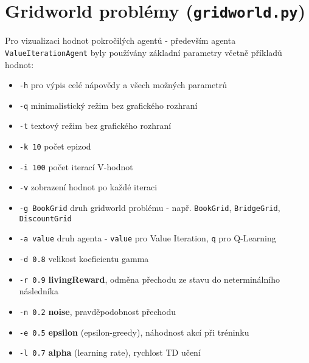 \section{Gridworld problémy (\texttt{gridworld.py})}
\label{priloha:manualg}
Pro vizualizaci hodnot pokročilých agentů - především agenta \texttt{ValueIterationAgent} byly používány základní parametry včetně příkladů hodnot:
\begin{itemize}
\item \texttt{-h} pro výpis celé nápovědy a všech možných parametrů
\item \texttt{-q} minimalistický režim bez grafického rozhraní
\item \texttt{-t} textový režim bez grafického rozhraní
\item \texttt{-k 10} počet epizod
\item \texttt{-i 100} počet iterací V-hodnot
\item \texttt{-v} zobrazení hodnot po každé iteraci
\item \texttt{-g BookGrid} druh gridworld problému - např. \texttt{BookGrid}, \texttt{BridgeGrid}, \texttt{DiscountGrid}
\item \texttt{-a value} druh agenta - \texttt{value} pro Value Iteration, \texttt{q} pro Q-Learning
\item \texttt{-d 0.8} velikost koeficientu gamma
\item \texttt{-r 0.9} \textbf{livingReward}, odměna přechodu ze stavu do neterminálního následníka
\item \texttt{-n 0.2} \textbf{noise}, pravděpodobnost přechodu 
\item \texttt{-e 0.5} \textbf{epsilon} (epsilon-greedy), náhodnost akcí při tréninku
\item \texttt{-l 0.7} \textbf{alpha} (learning rate), rychlost TD učení
\end{itemize}
